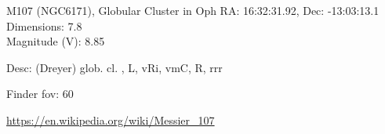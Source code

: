 \begin{block}{M107 (NGC6171), Globular Cluster in Oph}
    RA: 16:32:31.92, Dec: -13:03:13.1 \\ 
    Dimensions: 7.8 \\ 
    Magnitude (V): 8.85


    Desc: (Dreyer) glob. cl. , L, vRi, vmC, R, rrr 

    Finder fov: 60 

    \url{https://en.wikipedia.org/wiki/Messier_107} 
\end{block}